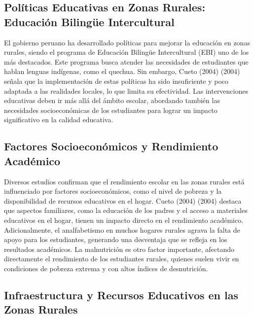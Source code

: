 \documentclass[
]{article}
\begin{document}
\subsection*{Políticas Educativas en Zonas Rurales: Educación Bilingüe
Intercultural}\label{poluxedticas-educativas-en-zonas-rurales-educaciuxf3n-bilinguxfce-intercultural}

\vspace{0.5cm}

El gobierno peruano ha desarrollado políticas para mejorar la educación
en zonas rurales, siendo el programa de Educación Bilingüe Intercultural
(EBI) uno de los más destacados. Este programa busca atender las
necesidades de estudiantes que hablan lenguas indígenas, como el
quechua. Sin embargo, Cueto (2004) (2004) señala que la implementación
de estas políticas ha sido insuficiente y poco adaptada a las realidades
locales, lo que limita su efectividad. Las intervenciones educativas
deben ir más allá del ámbito escolar, abordando también las necesidades
socioeconómicas de los estudiantes para lograr un impacto significativo
en la calidad educativa.

\subsection*{Factores Socioeconómicos y Rendimiento
Académico}\label{factores-socioeconuxf3micos-y-rendimiento-acaduxe9mico}

\vspace{0.5cm}

Diversos estudios confirman que el rendimiento escolar en las zonas
rurales está influenciado por factores socioeconómicos, como el nivel de
pobreza y la disponibilidad de recursos educativos en el hogar. Cueto
(2004) (2004) destaca que aspectos familiares, como la educación de los
padres y el acceso a materiales educativos en el hogar, tienen un
impacto directo en el rendimiento académico. Adicionalmente, el
analfabetismo en muchos hogares rurales agrava la falta de apoyo para
los estudiantes, generando una desventaja que se refleja en los
resultados académicos. La malnutrición es otro factor importante,
afectando directamente el rendimiento de los estudiantes rurales,
quienes suelen vivir en condiciones de pobreza extrema y con altos
índices de desnutrición.

\subsection*{Infraestructura y Recursos Educativos en las Zonas
Rurales}\label{infraestructura-y-recursos-educativos-en-las-zonas-rurales}
\end{document}
